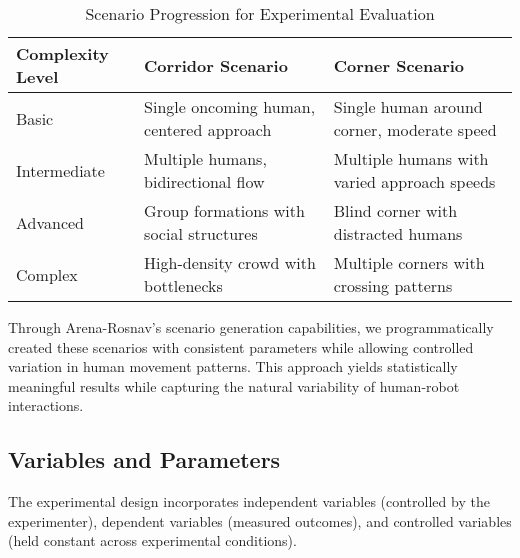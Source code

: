 \begin{table}[ht]
    \centering
    \caption{Scenario Progression for Experimental Evaluation}
    \label{tab:scenario_progression}
    \begin{tabularx}{\textwidth}{X X X}
        \hline
        \textbf{Complexity Level}           & \textbf{Corridor Scenario}                & \textbf{Corner Scenario} \\
        \hline
        Basic                               & Single oncoming human, centered approach  & Single human around corner, moderate speed \\
        Intermediate                        & Multiple humans, bidirectional flow       & Multiple humans with varied approach speeds \\
        Advanced                            & Group formations with social structures   & Blind corner with distracted humans \\
        Complex                             & High-density crowd with bottlenecks       & Multiple corners with crossing patterns \\
        \hline
    \end{tabularx}
\end{table}
Through Arena-Rosnav's scenario generation capabilities, we programmatically created these
 scenarios with consistent parameters while allowing controlled variation in human movement 
 patterns. This approach yields statistically meaningful results while capturing the natural 
 variability of human-robot interactions.


\subsection{Variables and Parameters}
\label{subsec:variables_parameters}
The experimental design incorporates independent variables (controlled by the experimenter), 
dependent variables (measured outcomes), and controlled variables (held constant 
across experimental conditions).


